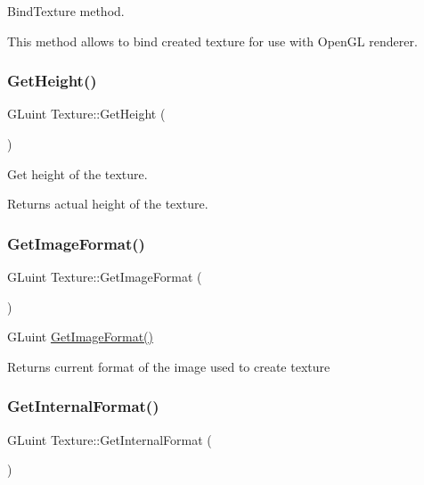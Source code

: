 Bind\+Texture method. 

This method allows to bind created texture for use with Open\+GL renderer. \mbox{\label{class_texture_a9313d6712c3af10b467db3b7c3d5a230}} 
\subsubsection{\texorpdfstring{GetHeight()}{GetHeight()}}
{\footnotesize\ttfamily G\+Luint Texture\+::\+Get\+Height (\begin{DoxyParamCaption}{ }\end{DoxyParamCaption})}



Get height of the texture. 

Returns actual height of the texture. \mbox{\label{class_texture_afac89e6e43962939aa13a289e2386fd9}} 
\subsubsection{\texorpdfstring{GetImageFormat()}{GetImageFormat()}}
{\footnotesize\ttfamily G\+Luint Texture\+::\+Get\+Image\+Format (\begin{DoxyParamCaption}{ }\end{DoxyParamCaption})}



G\+Luint \mbox{\hyperlink{class_texture_afac89e6e43962939aa13a289e2386fd9}{Get\+Image\+Format()}} 

Returns current format of the image used to create texture \mbox{\label{class_texture_a8a45061cc3ef1c5de2ac8a0977658de1}} 
\subsubsection{\texorpdfstring{GetInternalFormat()}{GetInternalFormat()}}
{\footnotesize\ttfamily G\+Luint Texture\+::\+Get\+Internal\+Format (\begin{DoxyParamCaption}{ }\end{DoxyParamCaption})}



